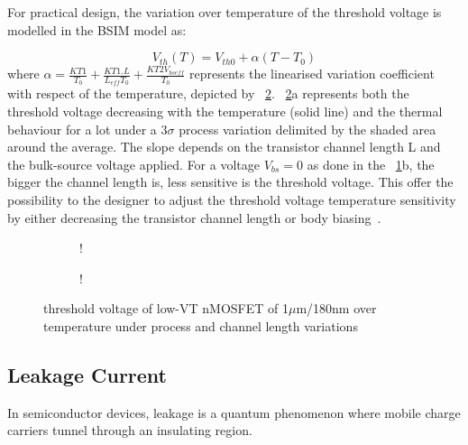 For practical design, the variation over temperature of the threshold voltage is modelled in the BSIM model as:

\begin{equation}
V_{th}(T) = V_{th0} + \alpha (T - T_0)
\end{equation}
where \(\alpha = \frac{KT1}{T_0}+\frac{KT1.L}{L_{eff} T_0}+\frac{KT2 V_{bseff}}{T_0}\) represents the linearised variation coefficient with respect of the temperature, depicted by \figurename~\ref{fig:vth_nel}. \figurename~\ref{fig:vth_nel}a represents both the threshold voltage decreasing with the temperature (solid line) and the thermal behaviour for a lot under a 3\(\sigma \) process variation delimited by the shaded area around the average. The slope depends on the transistor channel length L and the bulk-source voltage applied. For a voltage \(V_{bs} = 0 \) as done in the \figurename~\ref{fig:vth_nel_L}b, the bigger the channel length is, less sensitive is the threshold voltage. This offer the possibility to the designer to adjust the threshold voltage temperature sensitivity by either decreasing the transistor channel length or body biasing~\cite{Kumar2008}.

\begin{figure}[!ht]
    \centering
    \begin{subfigure}[b]{0.48\textwidth}
        \resizebox {\textwidth} {!} { 
            
        }
    \end{subfigure}
    \begin{subfigure}[b]{0.48\textwidth}
        \resizebox {\textwidth} {!} { 
            
        }
        \label{fig:vth_nel_L}
    \end{subfigure}
    \caption{threshold voltage of low-VT nMOSFET of 1\(\mu \)m/180nm over temperature under process and channel length variations}
    \label{fig:vth_nel}
\end{figure}

\subsection{Leakage Current}        %
In semiconductor devices, leakage is a quantum phenomenon where mobile charge carriers tunnel through an insulating region.

